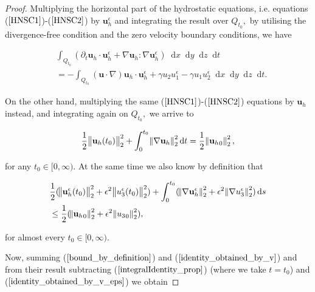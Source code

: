 \documentclass[11pt]{article}
\newcommand*\diff{\mathop{}\!\mathrm{d}}
\begin{document}
\begin{proof}

  Multiplying the horizontal part of the hydrostatic equations, i.e. equations ($\ref{HNSC1}$)-($\ref{HNSC2}$) by $\mathbf{u}_h^\epsilon$ and integrating the result over $Q_{t_0},$ by utilising the divergence-free condition and the zero velocity boundary conditions, we have
  
  \begin{equation} \label{identity_obtained_by_v_eps}
    \begin{split}
      & \int_{Q_{t_0}} (\partial_t \mathbf{u}_h \cdot \mathbf{u}_h^\epsilon + \nabla \mathbf{u}_h : \nabla \mathbf{u}_h^\epsilon) \diff x \diff y \diff z \diff t \\
      & = - \int_{Q_{t_0}} (\mathbf{u} \cdot \nabla) \mathbf{u}_h \cdot \mathbf{u}_h^\epsilon + \gamma u_2 u_1^\epsilon - \gamma u_1 u_2^\epsilon \diff x \diff y \diff z \diff t.
    \end{split}
  \end{equation}
  
  On the other hand, multiplying the same ($\ref{HNSC1}$)-($\ref{HNSC2}$) equations by $\mathbf{u}_h$ instead, and integrating again on $Q_{t_0},$ we arrive to
  
  \begin{equation} \label{identity_obtained_by_v}
    \frac{1}{2} \norm{\mathbf{u}_h(t_0)}_2^2 + \int_0^{t_0} \norm{\nabla \mathbf{u}_h}_2^2 \diff t = \frac{1}{2} \norm{{\mathbf{u}_h}_0}_2^2,
  \end{equation}
  
  for any $t_0 \in [0, \infty).$ At the same time we also know by definition that
  
  \begin{equation} \label{bound_by_definition}
    \begin{split}
      & \frac{1}{2}( \norm{\mathbf{u}_h^\epsilon (t_0)}_2^2 + \epsilon^2 \norm{u_3^\epsilon(t_0)}_2^2)+ \int_0^{t_0} (\norm{\nabla \mathbf{u}_h^\epsilon}_2^2 + \epsilon^2 \norm{\nabla u_3^\epsilon}_2^2) \diff s \\
      & \leq \frac{1}{2} (\norm{{\mathbf{u}_h}_0}_2^2 + \epsilon^2 \norm{{u_3}_0}_2^2),
    \end{split}
  \end{equation}
  
  for almost every $t_0 \in [0, \infty).$
  
  Now, summing ($\ref{bound_by_definition}$) and ($\ref{identity_obtained_by_v}$) and from their result subtracting ($\ref{integralIdentity_prop}$) (where we take $t= t_0$) and ($\ref{identity_obtained_by_v_eps}$) we obtain
  

\end{proof}
\end{document}
